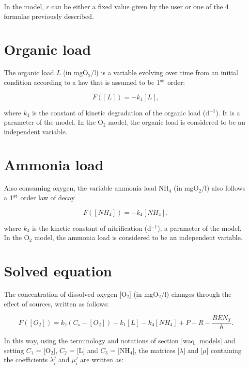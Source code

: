 In the model, $r$ can be either a fixed value given by the user or
one of the 4 formulae previously described.\\

\section{Organic load}

The organic load $L$ (in mgO$_2$/l) is a variable evolving over time
from an initial condition according to a law that is assumed to be 1$^{\rm{st}}$ order:

\begin{equation}
  F([L]) = -k_1 [L],
\end{equation}

where $k_1$ is the constant of kinetic degradation of the organic load (d$^{-1}$).
It is a parameter of the model.
In the O$_2$ model, the organic load is considered to be an independent variable.

\section{Ammonia load}

Also consuming oxygen, the variable ammonia load NH$_4$ (in mgO$_2$/l) also follows
a 1$^{\rm{st}}$ order law of decay

\begin{equation}
  F([NH_4]) = -k_4 [NH_4],
\end{equation}

where $k_4$ is the kinetic constant of nitrification (d$^{-1}$),
a parameter of the model.
In the O$_2$ model, the ammonia load is considered to be an independent variable.\\

\section{Solved equation}

The concentration of dissolved oxygen [O$_2$] (in mgO$_2$/l) changes
through the effect of sources, written as follows:

\begin{equation}
  F([O_2]) = k_2 (C_s - [O_2]) -k_1 [L] - k_4 [NH_4] + P - R - \frac{BEN_T}{h}.
\end{equation}

In this way, using the terminology and notations of section \ref{waq_models}
and setting $C_1$ = [O$_2$], $C_2$ = [L] and $C_3$ = [NH$_4$],
the matrices [$ \lambda $] and [$ \mu $] containing the coefficients
$\lambda_i^j$ and $ \mu_i^j$ are written as:\\

